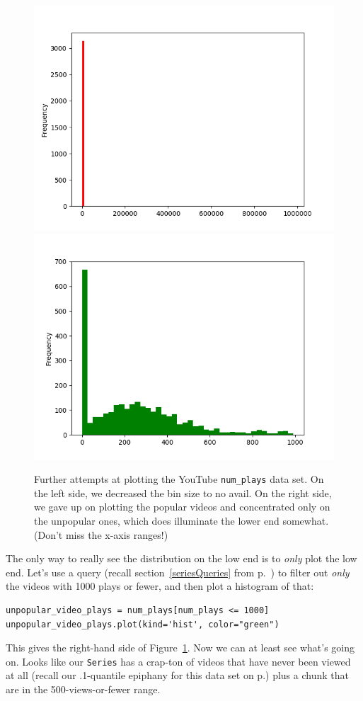 \begin{figure}[ht]
\centering
\includegraphics[width=.48\textwidth]{youtube2.png}
\includegraphics[width=.48\textwidth]{youtube3.png}
\caption{Further attempts at plotting the YouTube \texttt{num\_plays} data set.
On the left side, we decreased the bin size to no avail. On the right side, we
gave up on plotting the popular videos and concentrated only on the unpopular
ones, which does illuminate the lower end somewhat. (Don't miss the x-axis
ranges!)}
\label{fig:youtube23}
\end{figure}



The only way to really see the distribution on the low end is to \textit{only}
plot the low end. Let's use a query (recall section~\ref{seriesQueries} from
p.~\pageref{seriesQueries}) to filter out \textit{only} the videos with 1000
plays or fewer, and then plot a histogram of that:

\begin{Verbatim}[fontsize=\scriptsize,samepage=true,frame=single,framesep=3mm]
unpopular_video_plays = num_plays[num_plays <= 1000]
unpopular_video_plays.plot(kind='hist', color="green")
\end{Verbatim}

This gives the right-hand side of Figure~\ref{fig:youtube23}. Now we can at
least see what's going on. Looks like our \texttt{Series} has a crap-ton of
videos that have never been viewed at all (recall our .1-quantile epiphany for
this data set on p.\pageref{pointOneQuantileEpiphany}) plus a chunk that are in
the 500-views-or-fewer range.

